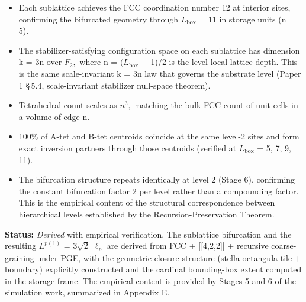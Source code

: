 \documentclass[11pt,oneside]{report}
\theoremstyle{definition}
\theoremstyle{remark}
\begin{document}
\begin{itemize}
\item
  Each sublattice achieves the FCC coordination number 12 at interior
  sites, confirming the bifurcated geometry through \ensuremath{L_{\mathrm{box}}} = 11 in
  storage units (n = 5).
\end{itemize}

\begin{itemize}
\item
  The stabilizer-satisfying configuration space on each sublattice has
  dimension k = 3n over \ensuremath{F_{2},} where n = \ensuremath{(L_{\mathrm{box}}} \ensuremath{-} 1)/2 is the level-local
  lattice depth. This is the same scale-invariant k = 3n law that
  governs the substrate level (Paper 1 \S\,5.4, scale-invariant stabilizer
  null-space theorem).
\end{itemize}

\begin{itemize}
\item
  Tetrahedral count scales as \ensuremath{n^{3},} matching the bulk FCC count of unit
  cells in a volume of edge n.
\end{itemize}

\begin{itemize}
\item
  100\% of A-tet and B-tet centroids coincide at the same level-2 sites
  and form exact inversion partners through those centroids (verified at
  \ensuremath{L_{\mathrm{box}}} = 5, 7, 9, 11).
\end{itemize}

\begin{itemize}
\item
  The bifurcation structure repeats identically at level 2 (Stage 6),
  confirming the constant bifurcation factor 2 per level rather than a
  compounding factor. This is the empirical content of the structural
  correspondence between hierarchical levels established by the
  Recursion-Preservation Theorem.
\end{itemize}

\textbf{Status:} \emph{Derived} with empirical verification. The
sublattice bifurcation and the resulting \ensuremath{L^{p(1)}} = \ensuremath{3\sqrt{2}} \ensuremath{\ell_{p}} are derived
from FCC + [[4,2,2]] + recursive coarse-graining under PGE, with
the geometric closure structure (stella-octangula tile + boundary)
explicitly constructed and the cardinal bounding-box extent computed in
the storage frame. The empirical content is provided by Stages 5 and 6
of the simulation work, summarized in Appendix E.
\end{document}

